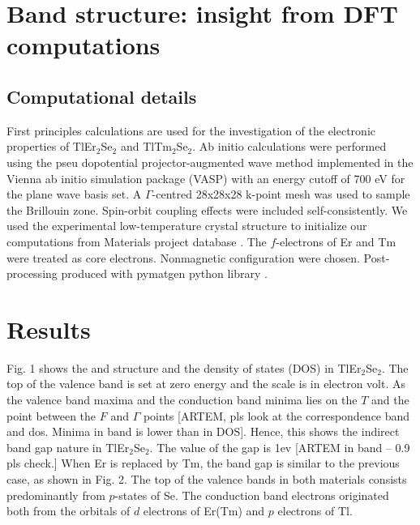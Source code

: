 \documentclass[onecolumn]{revtex4}
\date{\today}
\begin{document}
\maketitle
\tableofcontents
\section{Band structure: insight from DFT computations}
\subsection{Computational details}

First principles calculations are used for the investigation of the electronic properties of TlEr$_2$Se$_2$ and TlTm$_2$Se$_2$. 
Ab initio calculations were performed using the pseu
dopotential projector-augmented wave method \cite{Kresse1999} implemented in the Vienna ab initio simulation package
(VASP) \cite{Kresse1996,Kresse1993} with an energy cutoff of 700 eV for the plane wave basis set. A $\Gamma$-centred  28x28x28 k-point mesh was used to sample the Brillouin zone. Spin-orbit coupling effects were included self-consistently. We used the experimental low-temperature crystal structure to initialize our
computations from Materials project database \cite{MaterialsProject}. The $ f $-electrons of Er and Tm were treated as core electrons. Nonmagnetic configuration were chosen. Post-processing produced with pymatgen python library \cite{Pymatgen}. 
 
\section{Results}
Fig. 1 shows the and structure and the density of states (DOS) in TlEr$_2$Se$_2$. The top of the valence band is set at zero energy and the scale is in electron volt. As the valence band maxima and the conduction band minima lies on the $T$ and the point between the $F$ and $\Gamma$ points [ARTEM, pls look at the correspondence band and dos. Minima in band is lower than in DOS]. Hence, this shows the indirect band gap nature in TlEr$_2$Se$_2$. The value of the gap is 1ev [ARTEM in band -- 0.9 pls check.] 
When Er is replaced by Tm, the band gap is similar to the previous case, as shown in Fig. 2. 
The top of the valence bands in both materials consists predominantly from $ p $-states of Se.
The conduction band electrons originated both from the orbitals of $ d $  electrons of Er(Tm) and $ p $  electrons of Tl.  
 
 
\end{document}
